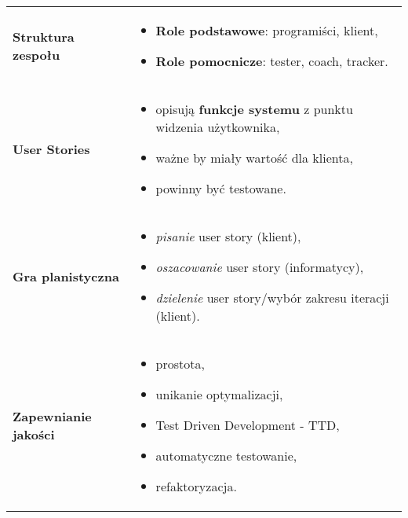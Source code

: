 \documentclass[a4paper]{article}
\begin{document}
    \begin{table}[H]
        \begin{center}
            \begin{tabular}{ p{8cm} p{8cm} }
                \textbf{Struktura zespołu}
                &
                \begin{itemize}
                    \item \textbf{Role podstawowe}: programiści, klient,
                    \item \textbf{Role pomocnicze}: tester, coach, tracker.
                \end{itemize}
                \\

                \cmidrule(r){1-1}\cmidrule(l){2-2}
                \textbf{User Stories}
                &
                \begin{itemize}
                    \item opisują \textbf{funkcje systemu} z punktu widzenia użytkownika,
                    \item ważne by miały wartość dla klienta,
                    \item powinny być testowane.
                \end{itemize}
                \\

                \cmidrule(r){1-1}\cmidrule(l){2-2}
                \textbf{Gra planistyczna}
                &
                \begin{itemize}
                    \item \textit{pisanie} user story (klient),
                    \item \textit{oszacowanie} user story (informatycy),
                    \item \textit{dzielenie} user story/wybór zakresu iteracji (klient).
                \end{itemize}
                \\

                \cmidrule(r){1-1}\cmidrule(l){2-2}
                \textbf{Zapewnianie jakości}
                &
                \begin{itemize}
                    \item prostota,
                    \item unikanie optymalizacji,
                    \item Test Driven Development - TTD,
                    \item automatyczne testowanie,
                    \item refaktoryzacja.
                \end{itemize}
                \\


\end{tabular}
\end{center}
\end{table}
\end{document}
